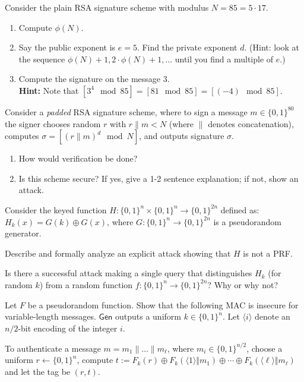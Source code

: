 \documentclass[a4paper,10pt,landscape,twocolumn]{scrartcl}
\begin{document}
\problems

\begin{exercise}
\begin{subex}
Consider the plain RSA signature scheme with modulus $N = 85 = 5 \cdot 17$.
\begin{enumerate}
\item  Compute $\phi(N)$.
\item  Say the public exponent is $e = 5$. Find the private exponent $d$. (Hint: look at
the sequence $\phi(N)+1, 2\cdot \phi(N)+1, \ldots$ until you find a multiple of $e$.)
\item  Compute the signature on the message $3$.\\\textbf{Hint: } Note that $[3^4 \mod 85] = [81 \mod 85] = [(-4) \mod 85]$.
\end{enumerate}
\end{subex}
\begin{subex}
Consider a \emph{padded} RSA signature scheme, where to sign a message $m \in \{0, 1\}^{80}$
the signer chooses random $r$ with $r \| m < N$ (where $\|$ denotes concatenation),
computes $\sigma = [(r \| m)^d \mod N ]$, and outputs signature $\sigma$.
\begin{enumerate}
\item  How would verification be done?
\item  Is this scheme secure? If yes, give a 1-2 sentence explanation; if not, show
an attack.
\end{enumerate}
\end{subex}
\end{exercise}


\begin{exercise}
Consider the keyed function $H : \{0, 1\}^n \times \{0, 1\}^n \rightarrow \{0, 1\}^{2n}$ defined as: $H_k(x) = G(k) \oplus G(x)$, where $G: \{0, 1\}^n \rightarrow \{0, 1\}^{2n}$ is a pseudorandom generator.
\begin{subex}
Describe and formally analyze an explicit attack showing that $H$ is not a PRF.
\end{subex}
\begin{subex}
Is there a successful attack making a single query that distinguishes $H_k$ (for random $k$) from a random function $f : \{0, 1\}^n \rightarrow \{0, 1\}^{2n}$? Why or why not?
\end{subex}
\end{exercise}



\begin{exercise}

Let $F$ be a pseudorandom function. Show that the following MAC is insecure for variable-length messages. $\mathsf{Gen}$ outputs a uniform $k\in\{0,1\}^n$. Let $\langle i\rangle$ denote an $n/2$-bit encoding of the integer $i$.

To authenticate a message $m=m_1\|\dots\| m_{\ell}$, where $m_i\in\{0,1\}^{n/2}$, choose a uniform $r\gets\{0,1\}^n$, compute $t:=F_k(r)\oplus F_k(\langle 1\rangle\Vert m_1)\oplus\cdots\oplus F_k(\langle \ell\rangle\Vert m_{\ell})$ and let the tag be $( r,t)$.

\end{exercise}
\end{document}
